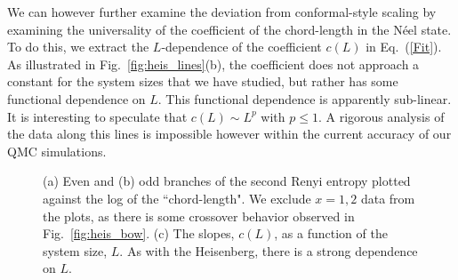 \documentclass[prl,aps,twocolumn,floatfix,amsmath,amssymb,superscriptaddress,tightenlines]{revtex4}
\begin{document}
We can however further examine the deviation from conformal-style scaling by examining the universality of the 
coefficient of the chord-length in the N\'eel state.
To do this, we extract the $L$-dependence of the coefficient $c(L)$ in Eq.~(\ref{Fit}).  As illustrated in Fig.~\ref{fig:heis_lines}(b),
the coefficient does not approach a constant for the system sizes that we have studied, but rather has some functional dependence on $L$.
This functional dependence is apparently sub-linear.  It is interesting to speculate that $c(L) \sim L^p$ with $p\leq1$.  A rigorous analysis of the data along this lines is impossible however within the current
accuracy of our QMC simulations.


 \begin{figure}
   \begin{center}
   \end{center}
   \caption{(a) Even and (b) odd branches of the second Renyi entropy plotted against the log of the ``chord-length". We exclude $x=1,2$ data from the plots, as there is some crossover behavior observed in Fig.~\ref{fig:heis_bow}. (c) The slopes, $c(L)$, as a function of the system size, $L$. As with the Heisenberg, there is a strong dependence on $L$.}
   \label{fig:2}
 \end{figure}
\end{document}
